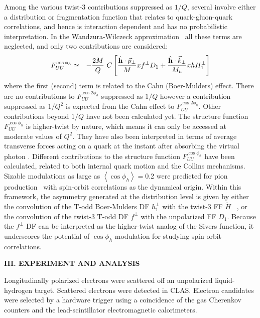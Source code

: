 \documentclass[aps,prl,twocolumn,showpacs,superscriptaddress,groupedaddress]{revtex4-1}  %
\newcommand{\FUUc}{F_{UU}^{\cos\phi_h}}
\newcommand{\FUUcc}{F_{UU}^{\cos2\phi_h}}
\newcommand{\kt}{\vec{k}_\perp}
\newcommand{\pt}{\vec{p}_\perp}
\newcommand{\ph}{\phi_h}
\begin{document}
Among the various twist-3 contributions suppressed as $1/Q$, several involve
either a distribution or fragmentation function that relates to
quark-gluon-quark correlations, and hence is interaction dependent and has no probabilistic
interpretation. In the Wandzura-Wilczeck approximation~\cite{Wandzura:1977qf}
all these terms are neglected, and only two contributions are considered: %
\begin{eqnarray} \nonumber
\label{Eq:cosphi}
\FUUc & \simeq & -\frac{2M}{Q}\  C\left[\frac{ \hat{\bf h} \cdot \pt}{M} xf^\perp D_1 +
\frac{\hat{\bf h} \cdot \kt}{M_h} 
xh H_1^\perp \right] \\
\end{eqnarray}
where the first (second) term is related to the Cahn (Boer-Mulders) effect.
There are no contributions to $\FUUcc$ suppressed as $1/Q$ however a contribution suppressed as $1/Q^2$ is expected from the Cahn effect to $\FUUcc$.
Other contributions beyond $1/Q$ have not been calculated yet.
The structure function $F^{\cos \ph}_{UU}$ is higher-twist by nature, which means it can only be accessed at moderate values of $Q^2$.
They have also been interpreted in terms of average transverse forces acting on a quark at the instant after absorbing the virtual photon \cite{Burkardt:2008vd}.
Different contributions to the structure function  $F^{\cos \ph}_{UU}$ have been calculated, related to both internal quark motion and the Collins mechanisms.
Sizable modulations as large as $\left< \cos \phi_h \right> = 0.2$ were predicted for pion production~\cite{Anselmino:2005nn} with spin-orbit correlations as the dynamical origin.
Within this framework, the asymmetry generated at the distribution level is given by either the convolution of the T-odd Boer-Mulders DF $h_1^{\perp}$ with the twist-3 FF $\tilde{H}$ ~\cite{Bacchetta:2006tn}, or the convolution of the  twist-3 T-odd DF $f^\perp$ with the unpolarized FF $D_1$\cite{Metz:2004je}.
Because the $f^\perp$ DF can be interpreted as the higher-twist analog of the Sivers function, it underscores the potential of $\cos\phi_h$ modulation for studying spin-orbit correlations.


\begin{center}
\textbf{III. EXPERIMENT AND ANALYSIS} \par
\end{center}
Longitudinally polarized electrons were scattered off an unpolarized liquid-hydrogen target. 
Scattered electrons were detected in CLAS.
Electron candidates were selected by a hardware trigger using a coincidence of the gas Cherenkov counters and the lead-scintillator electromagnetic calorimeters. 
\end{document}
